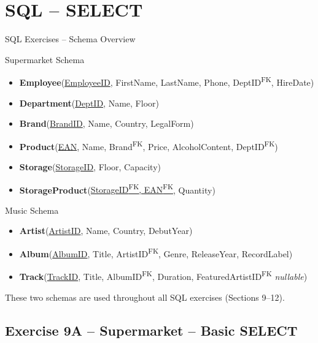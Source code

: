 \documentclass[10pt]{beamer}
\begin{document}
\section{SQL -- SELECT}

\begin{frame}{SQL Exercises -- Schema Overview}
  \begin{block}{Supermarket Schema}
    \small
    \begin{itemize}
      \item \textbf{Employee}(\underline{EmployeeID}, FirstName, LastName, Phone, DeptID\textsuperscript{FK}, HireDate)
      \item \textbf{Department}(\underline{DeptID}, Name, Floor)
      \item \textbf{Brand}(\underline{BrandID}, Name, Country, LegalForm)
      \item \textbf{Product}(\underline{EAN}, Name, Brand\textsuperscript{FK}, Price, AlcoholContent, DeptID\textsuperscript{FK})
      \item \textbf{Storage}(\underline{StorageID}, Floor, Capacity)
      \item \textbf{StorageProduct}(\underline{StorageID\textsuperscript{FK}, EAN\textsuperscript{FK}}, Quantity)
    \end{itemize}
  \end{block}

  \begin{block}{Music Schema}
    \small
    \begin{itemize}
      \item \textbf{Artist}(\underline{ArtistID}, Name, Country, DebutYear)
      \item \textbf{Album}(\underline{AlbumID}, Title, ArtistID\textsuperscript{FK}, Genre, ReleaseYear, RecordLabel)
      \item \textbf{Track}(\underline{TrackID}, Title, AlbumID\textsuperscript{FK}, Duration, FeaturedArtistID\textsuperscript{FK} \textit{nullable})
    \end{itemize}
  \end{block}

  These two schemas are used throughout all SQL exercises (Sections 9--12).
\end{frame}

\subsection{Exercise 9A -- Supermarket -- Basic SELECT}
\end{document}
